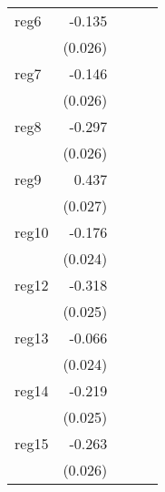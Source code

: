 {\begin{longtable}{l*{4}{D{.}{.}{-1}}}
\addlinespace
reg6        &      -0.135\sym{***}&                     &                     &                     \\
            &     (0.026)         &                     &                     &                     \\
\addlinespace
reg7        &      -0.146\sym{***}&                     &                     &                     \\
            &     (0.026)         &                     &                     &                     \\
\addlinespace
reg8        &      -0.297\sym{***}&                     &                     &                     \\
            &     (0.026)         &                     &                     &                     \\
\addlinespace
reg9        &       0.437\sym{***}&                     &                     &                     \\
            &     (0.027)         &                     &                     &                     \\
\addlinespace
reg10       &      -0.176\sym{***}&                     &                     &                     \\
            &     (0.024)         &                     &                     &                     \\
\addlinespace
reg12       &      -0.318\sym{***}&                     &                     &                     \\
            &     (0.025)         &                     &                     &                     \\
\addlinespace
reg13       &      -0.066\sym{**} &                     &                     &                     \\
            &     (0.024)         &                     &                     &                     \\
\addlinespace
reg14       &      -0.219\sym{***}&                     &                     &                     \\
            &     (0.025)         &                     &                     &                     \\
\addlinespace
reg15       &      -0.263\sym{***}&                     &                     &                     \\
            &     (0.026)         &                     &                     &                     \\

\end{longtable}}
